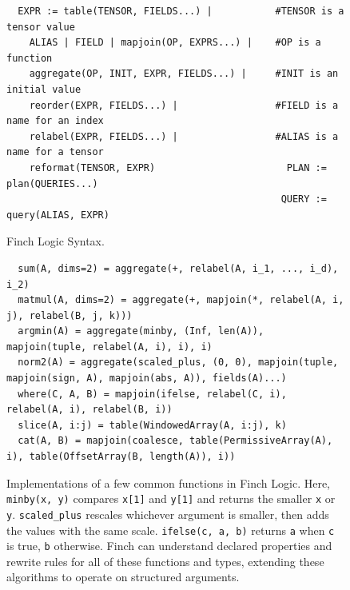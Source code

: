 
\begin{figure}
  \scriptsize
  \vspace{-12pt}
\begin{verbatim}
  EXPR := table(TENSOR, FIELDS...) |           #TENSOR is a tensor value
    ALIAS | FIELD | mapjoin(OP, EXPRS...) |    #OP is a function
    aggregate(OP, INIT, EXPR, FIELDS...) |     #INIT is an initial value
    reorder(EXPR, FIELDS...) |                 #FIELD is a name for an index
    relabel(EXPR, FIELDS...) |                 #ALIAS is a name for a tensor
    reformat(TENSOR, EXPR)                       PLAN := plan(QUERIES...)
                                                QUERY := query(ALIAS, EXPR)
\end{verbatim}
\vspace{-12pt}
\caption{\footnotesize Finch Logic Syntax. }\label{fig:finch_logic_syntax}
\vspace{-12pt}
\end{figure}
\begin{figure}[b]
\begin{verbatim}
  sum(A, dims=2) = aggregate(+, relabel(A, i_1, ..., i_d), i_2)
  matmul(A, dims=2) = aggregate(+, mapjoin(*, relabel(A, i, j), relabel(B, j, k)))
  argmin(A) = aggregate(minby, (Inf, len(A)), mapjoin(tuple, relabel(A, i), i), i)
  norm2(A) = aggregate(scaled_plus, (0, 0), mapjoin(tuple, mapjoin(sign, A), mapjoin(abs, A)), fields(A)...)
  where(C, A, B) = mapjoin(ifelse, relabel(C, i), relabel(A, i), relabel(B, i))
  slice(A, i:j) = table(WindowedArray(A, i:j), k)
  cat(A, B) = mapjoin(coalesce, table(PermissiveArray(A), i), table(OffsetArray(B, length(A)), i))
\end{verbatim}
\vspace{-12pt}
\caption{\footnotesize Implementations of a few common functions in Finch Logic. Here, \texttt{minby(x, y)} compares \texttt{x[1]} and \texttt{y[1]} and returns the smaller \texttt{x} or \texttt{y}. \texttt{scaled\_plus} rescales whichever argument is smaller, then adds the values with the same scale. \texttt{ifelse(c, a, b)} returns \texttt{a} when \texttt{c} is true,  \texttt{b} otherwise. Finch can understand declared properties and rewrite rules for all of these functions and types, extending these algorithms to operate on structured arguments.} \label{fig:api_extensible}
\vspace{-18pt}
\end{figure}
